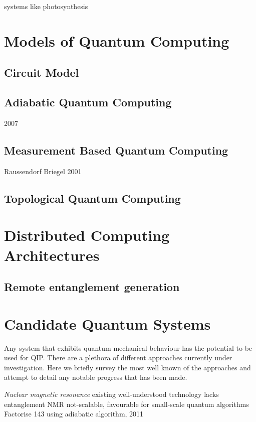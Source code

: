 systems like photosynthesis 

\section{Models of Quantum Computing}

\subsection{Circuit Model}

\subsection{Adiabatic Quantum Computing}
\cite{adiabatic_equivalent} 2007

\subsection{Measurement Based Quantum Computing}
\cite{one_way_qc} Raussendorf Briegel 2001

\subsection{Topological Quantum Computing}


\section{Distributed Computing Architectures}

\subsection{Remote entanglement generation}


\section{Candidate Quantum Systems}

Any system that exhibits quantum mechanical behaviour has the potential to be used for QIP. There are a plethora of different approaches currently under investigation. Here we briefly survey the most well known of the approaches and attempt to detail any notable progress that has been made.

\textit{Nuclear magnetic resonance}
existing well-understood technology
\cite{nmr_proposal_chuang_97}
lacks entanglement \cite{nmr_pseudo_pure}
NMR not-scalable, favourable for small-scale quantum algorithms
\cite{nmr_143_factorization} Factorise 143 using adiabatic algorithm, 2011

